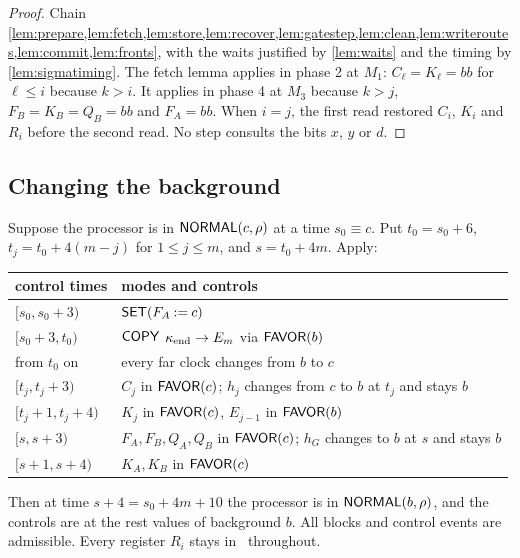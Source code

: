 \begin{proof}
Chain \cref{lem:prepare,lem:fetch,lem:store,lem:recover,lem:gatestep,lem:clean,lem:writeroutes,lem:commit,lem:fronts},
with the waits justified by \cref{lem:waits} and the timing by \cref{lem:sigmatiming}. The fetch
lemma applies in phase 2 at $M_1$: $C_\ell=K_\ell=bb$ for $\ell\le i$ because $k>i$. It applies in
phase 4 at $M_3$ because $k>j$, $F_B=K_B=Q_B=bb$ and $F_A=bb$. When $i=j$, the first read restored
$C_i$, $K_i$ and $R_i$ before the second read. No step consults the bits $x$, $y$ or $d$.
\end{proof}

\subsection{Changing the background}\label{sec:normalize}

\begin{lemma}\label{lem:normalize}
Suppose the processor is in $\textsf{NORMAL}(c,\rho)$ at a time $s_0\equiv c$. Put $t_0=s_0+6$,
$t_j=t_0+4(m-j)$ for $1\le j\le m$, and $s=t_0+4m$. Apply:
\begin{center}\small
\begin{tabular}{ll}\toprule
control times & modes and controls\\\midrule
$[s_0,s_0+3)$ & $\textsf{SET}(F_A\mathbin{:=}c)$\\
$[s_0+3,t_0)$ & $\textsf{COPY}$ $\kappa_{\mathrm{end}}\to E_m$ via $\textsf{FAVOR}(b)$\\
from $t_0$ on & every far clock changes from $b$ to $c$\\
$[t_j,t_j+3)$ & $C_j$ in $\textsf{FAVOR}(c)$; $h_j$ changes from $c$ to $b$ at $t_j$ and stays $b$\\
$[t_j+1,t_j+4)$ & $K_j$ in $\textsf{FAVOR}(c)$, $E_{j-1}$ in $\textsf{FAVOR}(b)$\\
$[s,s+3)$ & $F_A,F_B,Q_A,Q_B$ in $\textsf{FAVOR}(c)$; $h_G$ changes to $b$ at $s$ and stays $b$\\
$[s+1,s+4)$ & $K_A,K_B$ in $\textsf{FAVOR}(c)$\\\bottomrule
\end{tabular}
\end{center}
Then at time $s+4=s_0+4m+10$ the processor is in $\textsf{NORMAL}(b,\rho)$, and the controls are at the rest
values of background $b$. All blocks and control events are admissible. Every register $R_i$ stays
in \HOLD\ throughout.
\end{lemma}

